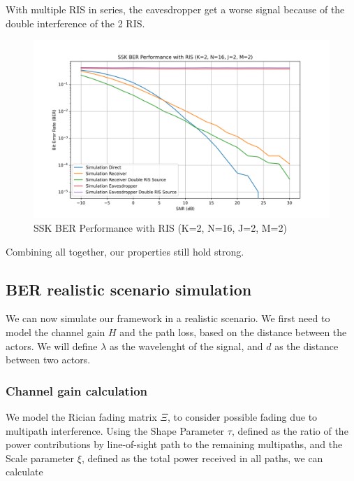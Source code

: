With multiple RIS in series, the eavesdropper get a worse signal because of the double interference of the 2 RIS.

\begin{figure}[H]
  \centering
  \includegraphics[width=\linewidth]{imgs/ber-simulations/SSK BER Performance with RIS (K=2, N=16, J=2, M=2).png}
  \caption{SSK BER Performance with RIS (K=2, N=16, J=2, M=2)}
  \label{fig:simulation_j2_m2}
\end{figure}

Combining all together, our properties still hold strong.

\subsection{BER realistic scenario simulation}

We can now simulate our framework in a realistic scenario. We first need to model the channel gain $H$ and the path loss, based on the distance between the actors. We will define $\lambda$ as the wavelenght of the signal, and $d$ as the distance between two actors.

\subsubsection{Channel gain calculation}

We model the Rician fading \cite{Rician_fading} matrix $\Xi$, to consider possible fading due to multipath interference. Using the Shape Parameter $\tau$, defined as the ratio of the power contributions by line-of-sight path to the remaining multipaths, and the Scale parameter $\xi$, defined as the total power received in all paths, we can calculate

